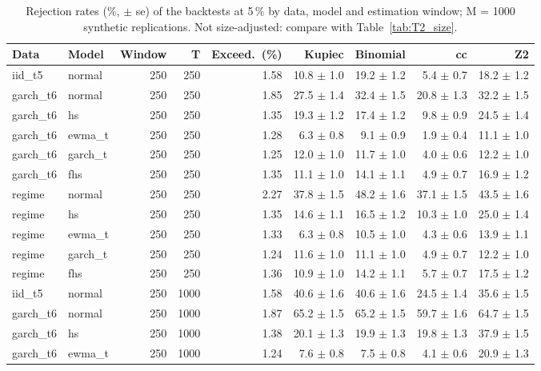 \begin{table}[H]
\centering
\scriptsize
\caption{Rejection rates (\%, $\pm$ se) of the backtests at 5\,\% by data, model and estimation window; M = 1000 synthetic replications. Not size-adjusted: compare with Table~\ref{tab:T2_size}.}
\label{tab:T3_power}
\begin{tabular}{llrrrrrrr}
\toprule
Data & Model & Window & T & Exceed.\ (\%) & Kupiec & Binomial & cc & Z2 \\
\midrule
iid\_t5 & normal & 250 & 250 & 1.58 & 10.8 $\pm$ 1.0 & 19.2 $\pm$ 1.2 & 5.4 $\pm$ 0.7 & 18.2 $\pm$ 1.2 \\
garch\_t6 & normal & 250 & 250 & 1.85 & 27.5 $\pm$ 1.4 & 32.4 $\pm$ 1.5 & 20.8 $\pm$ 1.3 & 32.2 $\pm$ 1.5 \\
garch\_t6 & hs & 250 & 250 & 1.35 & 19.3 $\pm$ 1.2 & 17.4 $\pm$ 1.2 & 9.8 $\pm$ 0.9 & 24.5 $\pm$ 1.4 \\
garch\_t6 & ewma\_t & 250 & 250 & 1.28 & 6.3 $\pm$ 0.8 & 9.1 $\pm$ 0.9 & 1.9 $\pm$ 0.4 & 11.1 $\pm$ 1.0 \\
garch\_t6 & garch\_t & 250 & 250 & 1.25 & 12.0 $\pm$ 1.0 & 11.7 $\pm$ 1.0 & 4.0 $\pm$ 0.6 & 12.2 $\pm$ 1.0 \\
garch\_t6 & fhs & 250 & 250 & 1.35 & 11.1 $\pm$ 1.0 & 14.1 $\pm$ 1.1 & 4.9 $\pm$ 0.7 & 16.9 $\pm$ 1.2 \\
regime & normal & 250 & 250 & 2.27 & 37.8 $\pm$ 1.5 & 48.2 $\pm$ 1.6 & 37.1 $\pm$ 1.5 & 43.5 $\pm$ 1.6 \\
regime & hs & 250 & 250 & 1.35 & 14.6 $\pm$ 1.1 & 16.5 $\pm$ 1.2 & 10.3 $\pm$ 1.0 & 25.0 $\pm$ 1.4 \\
regime & ewma\_t & 250 & 250 & 1.33 & 6.3 $\pm$ 0.8 & 10.5 $\pm$ 1.0 & 4.3 $\pm$ 0.6 & 13.9 $\pm$ 1.1 \\
regime & garch\_t & 250 & 250 & 1.24 & 11.6 $\pm$ 1.0 & 11.1 $\pm$ 1.0 & 4.9 $\pm$ 0.7 & 12.2 $\pm$ 1.0 \\
regime & fhs & 250 & 250 & 1.36 & 10.9 $\pm$ 1.0 & 14.2 $\pm$ 1.1 & 5.7 $\pm$ 0.7 & 17.5 $\pm$ 1.2 \\
\midrule
iid\_t5 & normal & 250 & 1000 & 1.58 & 40.6 $\pm$ 1.6 & 40.6 $\pm$ 1.6 & 24.5 $\pm$ 1.4 & 35.6 $\pm$ 1.5 \\
garch\_t6 & normal & 250 & 1000 & 1.87 & 65.2 $\pm$ 1.5 & 65.2 $\pm$ 1.5 & 59.7 $\pm$ 1.6 & 64.7 $\pm$ 1.5 \\
garch\_t6 & hs & 250 & 1000 & 1.38 & 20.1 $\pm$ 1.3 & 19.9 $\pm$ 1.3 & 19.8 $\pm$ 1.3 & 37.9 $\pm$ 1.5 \\
garch\_t6 & ewma\_t & 250 & 1000 & 1.24 & 7.6 $\pm$ 0.8 & 7.5 $\pm$ 0.8 & 4.1 $\pm$ 0.6 & 20.9 $\pm$ 1.3 \\

\end{tabular}
\end{table}
